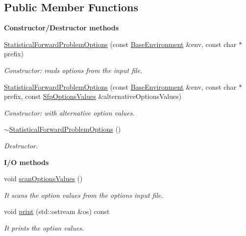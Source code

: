 \subsection*{Public Member Functions}
\begin{Indent}{\bf Constructor/\-Destructor methods}\par
\begin{DoxyCompactItemize}
\item 
\hyperlink{class_q_u_e_s_o_1_1_statistical_forward_problem_options_a1c538c09b3c85e59a805fdf1613d7106}{Statistical\-Forward\-Problem\-Options} (const \hyperlink{class_q_u_e_s_o_1_1_base_environment}{Base\-Environment} \&env, const char $\ast$prefix)
\begin{DoxyCompactList}\small\item\em Constructor\-: reads options from the input file. \end{DoxyCompactList}\item 
\hyperlink{class_q_u_e_s_o_1_1_statistical_forward_problem_options_a85e048ec9fe9332879a2fafb5735a8ba}{Statistical\-Forward\-Problem\-Options} (const \hyperlink{class_q_u_e_s_o_1_1_base_environment}{Base\-Environment} \&env, const char $\ast$prefix, const \hyperlink{class_q_u_e_s_o_1_1_sfp_options_values}{Sfp\-Options\-Values} \&alternative\-Options\-Values)
\begin{DoxyCompactList}\small\item\em Constructor\-: with alternative option values. \end{DoxyCompactList}\item 
\hyperlink{class_q_u_e_s_o_1_1_statistical_forward_problem_options_a77e78ff0d42128d04db946aa3d002b26}{$\sim$\-Statistical\-Forward\-Problem\-Options} ()
\begin{DoxyCompactList}\small\item\em Destructor. \end{DoxyCompactList}\end{DoxyCompactItemize}
\end{Indent}
\begin{Indent}{\bf I/\-O methods}\par
\begin{DoxyCompactItemize}
\item 
void \hyperlink{class_q_u_e_s_o_1_1_statistical_forward_problem_options_a79677f13d8f76171e0e9482920d1e07c}{scan\-Options\-Values} ()
\begin{DoxyCompactList}\small\item\em It scans the option values from the options input file. \end{DoxyCompactList}\item 
void \hyperlink{class_q_u_e_s_o_1_1_statistical_forward_problem_options_a09fead4b82b68d38aaab1072eaacf3e3}{print} (std\-::ostream \&os) const 
\begin{DoxyCompactList}\small\item\em It prints the option values. \end{DoxyCompactList}\end{DoxyCompactItemize}
\end{Indent}
